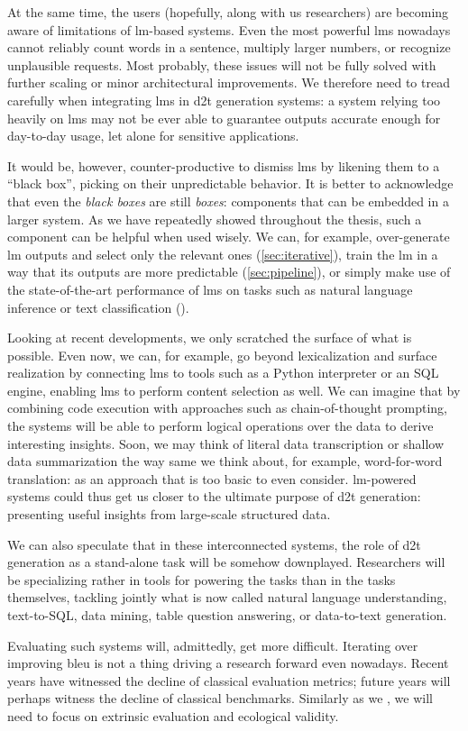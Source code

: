 At the same time, the users (hopefully, along with us researchers) are becoming aware of limitations of \ac{lm}-based systems. Even the most powerful \acp{lm} nowadays cannot reliably count words in a sentence, multiply larger numbers, or recognize unplausible requests. Most probably, these issues will not be fully solved with further scaling or minor architectural improvements. We therefore need to tread carefully when integrating \acp{lm} in \ac{d2t} generation systems: a system relying too heavily on \acp{lm} may not be ever able to guarantee outputs accurate enough for day-to-day usage, let alone for sensitive applications.

It would be, however, counter-productive to dismiss \acp{lm} by likening them to a ``black box'', picking on their unpredictable behavior. It is better to acknowledge that even the \emph{black boxes} are still \emph{boxes}: components that can be embedded in a larger system. As we have repeatedly showed throughout the thesis, such a component can be helpful when used wisely. We can, for example, over-generate \ac{lm} outputs and select only the relevant ones (\autoref{sec:iterative}), train the \ac{lm} in a way that its outputs are more predictable (\autoref{sec:pipeline}), or simply make use of the state-of-the-art performance of \acp{lm} on tasks such as natural language inference or text classification ().

Looking at recent developments, we only scratched the surface of what is possible. Even now, we can, for example, go beyond lexicalization and surface realization by connecting \acp{lm} to tools such as a Python interpreter or an SQL engine, enabling \acp{lm} to perform content selection as well. We can imagine that by combining code execution with approaches such as chain-of-thought prompting, the systems will be able to perform logical operations over the data to derive interesting insights. Soon, we may think of literal data transcription or shallow data summarization the way same we think about, for example, word-for-word translation: as an approach that is too basic to even consider. \ac{lm}-powered systems could thus get us closer to the ultimate purpose of \ac{d2t} generation: presenting useful insights from large-scale structured data.

We can also speculate that in these interconnected systems, the role of \ac{d2t} generation as a stand-alone task will be somehow downplayed. Researchers will be specializing rather in tools for powering the tasks than in the tasks themselves, tackling jointly what is now called natural language understanding, text-to-SQL, data mining, table question answering, or data-to-text generation.

Evaluating such systems will, admittedly, get more difficult. Iterating over improving \acs{bleu} is not a thing driving a research forward even nowadays. Recent years have witnessed the decline of classical evaluation metrics; future years will perhaps witness the decline of classical benchmarks. Similarly as we , we will need to focus on extrinsic evaluation and ecological validity.
